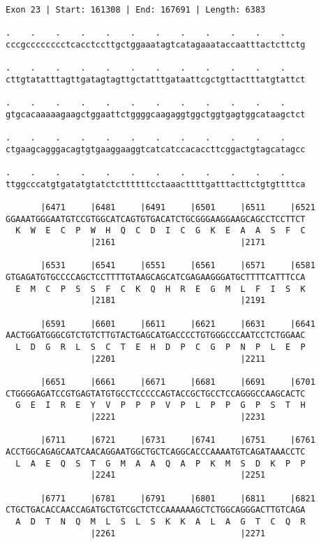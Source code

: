 \documentclass{article}
\begin{document}
\newpage
\begin{Verbatim}
Exon 23 | Start: 161308 | End: 167691 | Length: 6383
 
.    .    .    .    .    .    .    .    .    .    .    .    
cccgcccccccctcacctccttgctggaaatagtcatagaaataccaatttactcttctg
  
.    .    .    .    .    .    .    .    .    .    .    .    
cttgtatatttagttgatagtagttgctatttgataattcgctgttactttatgtattct
  
.    .    .    .    .    .    .    .    .    .    .    .    
gtgcacaaaaagaagctggaattctggggcaagaggtggctggtgagtggcataagctct
  
.    .    .    .    .    .    .    .    .    .    .    .    
ctgaagcagggacagtgtgaaggaaggtcatcatccacaccttcggactgtagcatagcc
  
.    .    .    .    .    .    .    .    .    .    .    .    
ttggcccatgtgatatgtatctcttttttcctaaacttttgatttacttctgtgttttca
  
       |6471     |6481     |6491     |6501     |6511     |6521
GGAAATGGGAATGTCCGTGGCATCAGTGTGACATCTGCGGGAAGGAAGCAGCCTCCTTCT
  K  W  E  C  P  W  H  Q  C  D  I  C  G  K  E  A  A  S  F  C
                 |2161                         |2171        
  
       |6531     |6541     |6551     |6561     |6571     |6581
GTGAGATGTGCCCCAGCTCCTTTTGTAAGCAGCATCGAGAAGGGATGCTTTTCATTTCCA
  E  M  C  P  S  S  F  C  K  Q  H  R  E  G  M  L  F  I  S  K
                 |2181                         |2191        
  
       |6591     |6601     |6611     |6621     |6631     |6641
AACTGGATGGGCGTCTGTCTTGTACTGAGCATGACCCCTGTGGGCCCAATCCTCTGGAAC
  L  D  G  R  L  S  C  T  E  H  D  P  C  G  P  N  P  L  E  P
                 |2201                         |2211        
  
       |6651     |6661     |6671     |6681     |6691     |6701
CTGGGGAGATCCGTGAGTATGTGCCTCCCCCAGTACCGCTGCCTCCAGGGCCAAGCACTC
  G  E  I  R  E  Y  V  P  P  P  V  P  L  P  P  G  P  S  T  H
                 |2221                         |2231        
  
       |6711     |6721     |6731     |6741     |6751     |6761
ACCTGGCAGAGCAATCAACAGGAATGGCTGCTCAGGCACCCAAAATGTCAGATAAACCTC
  L  A  E  Q  S  T  G  M  A  A  Q  A  P  K  M  S  D  K  P  P
                 |2241                         |2251        
  
       |6771     |6781     |6791     |6801     |6811     |6821
CTGCTGACACCAACCAGATGCTGTCGCTCTCCAAAAAAGCTCTGGCAGGGACTTGTCAGA
  A  D  T  N  Q  M  L  S  L  S  K  K  A  L  A  G  T  C  Q  R
                 |2261                         |2271        
  

\end{Verbatim}
\end{document}

